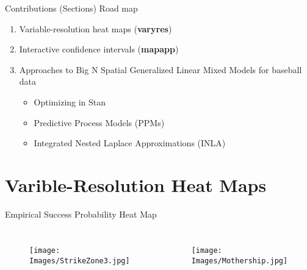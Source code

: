 \documentclass{beamer}
\begin{document}
\begin{frame}{Contributions (Sections) Road map}{}
\begin{enumerate}
\addtolength{\itemsep}{0.5\baselineskip}
\item Variable-resolution heat maps ({\bf varyres})
\item Interactive confidence intervals ({\bf mapapp})
\item Approaches to Big N Spatial Generalized Linear Mixed Models for baseball data \\
  \begin{itemize}
  \addtolength{\itemsep}{0.5\baselineskip}
  \item Optimizing in Stan \citep{STANtheMan}
  \item Predictive Process Models (PPMs) \citep{Banerjee2008}
  \item Integrated Nested Laplace Approximations (INLA) \citep{Rue2009}
  \end{itemize}
\end{enumerate}
\end{frame}

\section{Varible-Resolution Heat Maps}

\begin{frame}{Empirical Success Probability Heat Map} %
\begin{columns}


  \begin{figure}[H]
	\centering
	\texttt{[image: Images/StrikeZone3.jpg]}
	\end{figure}

  \begin{figure}[H]
	\centering
	\texttt{[image: Images/Mothership.jpg]}
	\end{figure}

\end{columns}
\end{frame}
\end{document}
